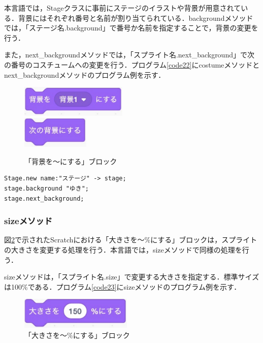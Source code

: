 \documentclass[10pt,a4j]{ltjsarticle}
\begin{document}
本言語では，Stageクラスに事前にステージのイラストや背景が用意されている．背景にはそれぞれ番号と名前が割り当てられている．backgroundメソッドでは，「ステージ名.background」で番号か名前を指定することで，背景の変更を行う．

また，next\_backgroundメソッドでは，「スプライト名.next\_background」で次の番号のコスチュームへの変更を行う．プログラム\ref{code22}にcostumeメソッドとnext\_backgroundメソッドのプログラム例を示す．

\begin{figure}[H]
  \centering
  \includegraphics[height=15mm]{images/set.pdf} \\
  \includegraphics[height=15mm]{images/next_set.pdf} 
  \caption{「背景を〜にする」ブロック}
  \label{fig:background}
\end{figure}

\begin{lstlisting}[caption=backgroundメソッドとnext\_backgroundメソッドのプログラム例, label=code22]
Stage.new name:"ステージ" -> stage;
stage.background "ゆき";
stage.next_background;
\end{lstlisting}

\subsubsection{sizeメソッド}
図\ref{fig:size}で示されたScratchにおける「大きさを〜\%にする」ブロックは，スプライトの大きさを変更する処理を行う．本言語では，sizeメソッドで同様の処理を行う．

sizeメソッドは，「スプライト名.size」で変更する大きさを指定する．標準サイズは100\%である．プログラム\ref{code23}にsizeメソッドのプログラム例を示す．

\begin{figure}[H]
  \centering
  \includegraphics[height=15mm]{images/size.pdf}
  \caption{「大きさを〜\%にする」ブロック}
  \label{fig:size}
\end{figure}
\end{document}
